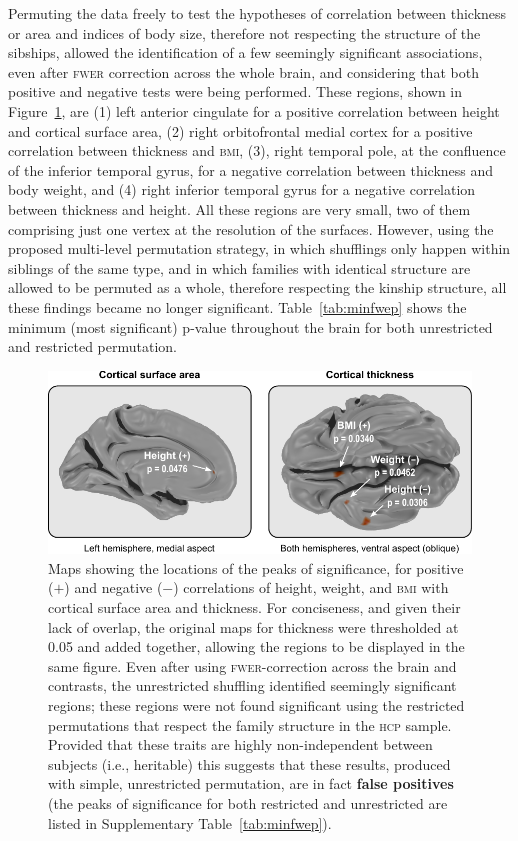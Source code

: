 Permuting the data freely to test the hypotheses of correlation between thickness or area and indices of body size, therefore not respecting the structure of the sibships, allowed the identification of a few seemingly significant associations, even after \textsc{fwer} correction across the whole brain, and considering that both positive and negative tests were being performed. These regions, shown in Figure~\ref{fig:realdata}, are (1) left anterior cingulate for a positive correlation between height and cortical surface area, (2) right orbitofrontal medial cortex for a positive correlation between thickness and \textsc{bmi}, (3), right temporal pole, at the confluence of the inferior temporal gyrus, for a negative correlation between thickness and body weight, and (4) right inferior temporal gyrus for a negative correlation between thickness and height. All these regions are very small, two of them comprising just one vertex at the resolution of the surfaces. However, using the proposed multi-level permutation strategy, in which shufflings only happen within siblings of the same type, and in which families with identical structure are allowed to be permuted as a whole, therefore respecting the kinship structure, all these findings became no longer significant. Table~\ref{tab:minfwep} shows the minimum (most significant) p-value throughout the brain for both unrestricted and restricted permutation.

\begin{figure}[!tp]
\centering
\includegraphics{figures/realdata.pdf}
\caption[Maps showing significant correlations (false positives) of height, weight, and \textsc{bmi} with cortical surface area and thickness.]{Maps showing the locations of the peaks of significance, for positive ($+$) and negative ($-$) correlations of height, weight, and \textsc{bmi} with cortical surface area and thickness. For conciseness, and given their lack of overlap, the original maps for thickness were thresholded at 0.05 and added together, allowing the regions to be displayed in the same figure. Even after using \textsc{fwer}-correction across the brain and contrasts, the unrestricted shuffling identified seemingly significant regions; these regions were not found significant using the restricted permutations that respect the family structure in the \textsc{hcp} sample. Provided that these traits are highly non-independent between subjects (i.e., heritable) this suggests that these results, produced with simple, unrestricted permutation, are in fact \textbf{false positives} (the peaks of significance for both restricted and unrestricted are listed in Supplementary Table~\ref{tab:minfwep}).}
\label{fig:realdata}
\end{figure}

